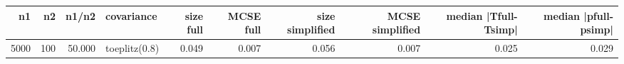 \begin{tabular}{rrrlrrrrrr}
\toprule
n1 & n2 & n1/n2 & covariance & size full & MCSE full & size simplified & MCSE simplified & median |Tfull-Tsimp| & median |pfull-psimp| \\
\midrule
5000 & 100 & 50.000 & toeplitz(0.8) & 0.049 & 0.007 & 0.056 & 0.007 & 0.025 & 0.029 \\
\bottomrule
\end{tabular}
